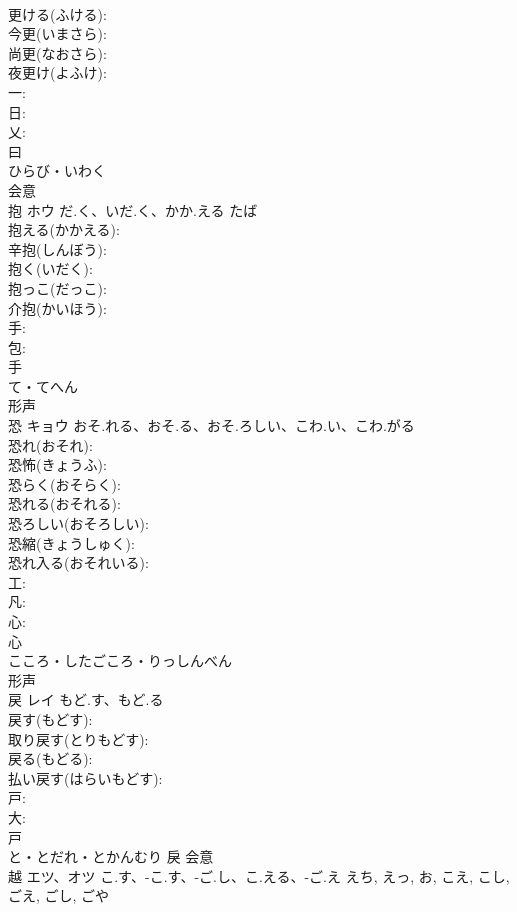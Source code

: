 \documentclass[8pt]{extreport}
\begin{document}
\begin{CJK}{UTF8}{min}
\\	更ける(ふける): 
\\	今更(いまさら): 
\\	尚更(なおさら): 
\\	夜更け(よふけ): 
\\	一: 
\\	日: 
\\	乂: 
\\	曰	
\\	ひらび・いわく	
\\	会意 
\\	抱	ホウ	だ.く、いだ.く、かか.える	たば	
\\	抱える(かかえる): 
\\	辛抱(しんぼう): 
\\	抱く(いだく): 
\\	抱っこ(だっこ): 
\\	介抱(かいほう): 
\\	手: 
\\	包: 
\\	手	
\\	て・てへん	
\\	形声 
\\	恐	キョウ	おそ.れる、おそ.る、おそ.ろしい、こわ.い、こわ.がる		
\\	恐れ(おそれ): 
\\	恐怖(きょうふ): 
\\	恐らく(おそらく): 
\\	恐れる(おそれる): 
\\	恐ろしい(おそろしい): 
\\	恐縮(きょうしゅく): 
\\	恐れ入る(おそれいる): 
\\	工: 
\\	凡: 
\\	心: 
\\	心	
\\	こころ・したごころ・りっしんべん	
\\	形声 
\\	戻	レイ	もど.す、もど.る		
\\	戻す(もどす): 
\\	取り戻す(とりもどす): 
\\	戻る(もどる): 
\\	払い戻す(はらいもどす): 
\\	戸: 
\\	大: 
\\	戸	
\\	と・とだれ・とかんむり	戾	会意 
\\	越	エツ、オツ	こ.す、-こ.す、-ご.し、こ.える、-ご.え	えち, えっ, お, こえ, こし, ごえ, ごし, ごや	

\end{CJK}
\end{document}

